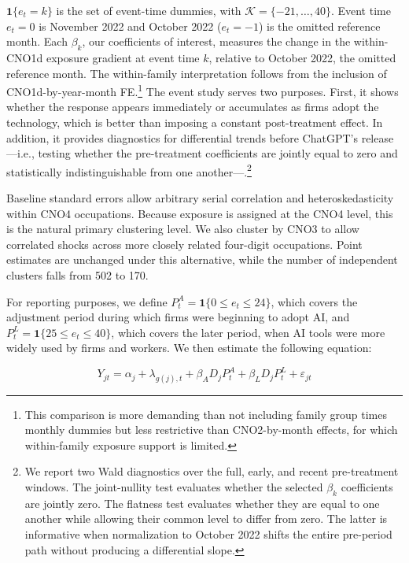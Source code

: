 \(\mathbf{1}\{e_t=k\}\) is the set of event-time dummies, with \(\mathcal{K}=\{-21,\ldots,40\}\). Event time \(e_t=0\) is November 2022 and October 2022 (\(e_t=-1\)) is the omitted reference month. Each \(\beta_k\), our coefficients of interest, measures the change in the within-CNO1d exposure gradient at event time \(k\), relative to October 2022, the omitted reference month. The within-family interpretation follows from the inclusion of CNO1d-by-year-month FE.\footnote{This comparison is more demanding than not including family group times monthly dummies but less restrictive than CNO2-by-month effects, for which within-family exposure support is limited.} The event study serves two purposes. First, it shows whether the response appears immediately or accumulates as firms adopt the technology, which is better than imposing a constant post-treatment effect. In addition, it provides diagnostics for differential trends before ChatGPT's release---i.e., testing whether the pre-treatment coefficients are jointly equal to zero and statistically indistinguishable from one another---.\footnote{We report two Wald diagnostics over the full, early, and recent pre-treatment windows. The joint-nullity test evaluates whether the selected \(\beta_k\) coefficients are jointly zero. The flatness test evaluates whether they are equal to one another while allowing their common level to differ from zero. The latter is informative when normalization to October 2022 shifts the entire pre-period path without producing a differential slope.}

Baseline standard errors allow arbitrary serial correlation and heteroskedasticity within CNO4 occupations. Because exposure is assigned at the CNO4 level, this is the natural primary clustering level. We also cluster by CNO3 to allow correlated shocks across more closely related four-digit occupations. Point estimates are unchanged under this alternative, while the number of independent clusters falls from 502 to 170.

For reporting purposes, we define \(P^A_t=\mathbf{1}\{0\leq e_t\leq24\}\), which covers the adjustment period during which firms were beginning to adopt AI, and \(P^L_t=\mathbf{1}\{25\leq e_t\leq40\}\), which covers the later period, when AI tools were more widely used by firms and workers. We then estimate the following equation:

\begin{equation}
Y_{jt}=\alpha_j+\lambda_{g(j),t}+\beta_A D_jP^A_t+\beta_L D_jP^L_t+\varepsilon_{jt}
\label{eq:baseline_static}
\end{equation}

